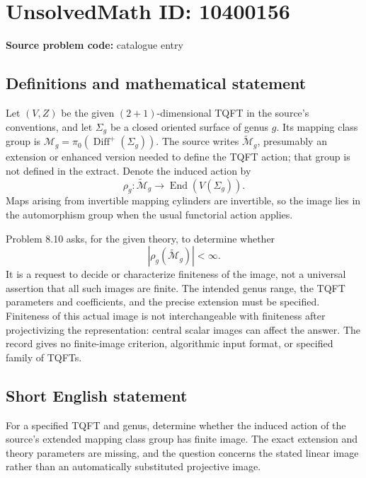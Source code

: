 \documentclass[11pt]{article}
\begin{document}
\section*{UnsolvedMath ID: 10400156}
\textbf{Source problem code:} catalogue entry
\subsection{Definitions and mathematical statement}
Let \((V,Z)\) be the given \((2+1)\)-dimensional TQFT in the source's conventions, and let \(\Sigma_g\) be a closed oriented surface of genus \(g\). Its mapping class group is \(\mathcal M_g=\pi_0(\operatorname{Diff}^+(\Sigma_g))\). The source writes \(\widetilde{\mathcal M}_g\), presumably an extension or enhanced version needed to define the TQFT action; that group is not defined in the extract. Denote the induced action by
\[
 \rho_g:\widetilde{\mathcal M}_g
       \longrightarrow\operatorname{End}(V(\Sigma_g)).
\]
Maps arising from invertible mapping cylinders are invertible, so the image lies in the automorphism group when the usual functorial action applies.

Problem 8.10 asks, for the given theory, to determine whether
\[
 \left|\rho_g(\widetilde{\mathcal M}_g)\right|<\infty.
\]
It is a request to decide or characterize finiteness of the image, not a universal assertion that all such images are finite. The intended genus range, the TQFT parameters and coefficients, and the precise extension must be specified. Finiteness of this actual image is not interchangeable with finiteness after projectivizing the representation: central scalar images can affect the answer. The record gives no finite-image criterion, algorithmic input format, or specified family of TQFTs.
\subsection{Short English statement}
For a specified TQFT and genus, determine whether the induced action of the source's extended mapping class group has finite image. The exact extension and theory parameters are missing, and the question concerns the stated linear image rather than an automatically substituted projective image.
\end{document}
